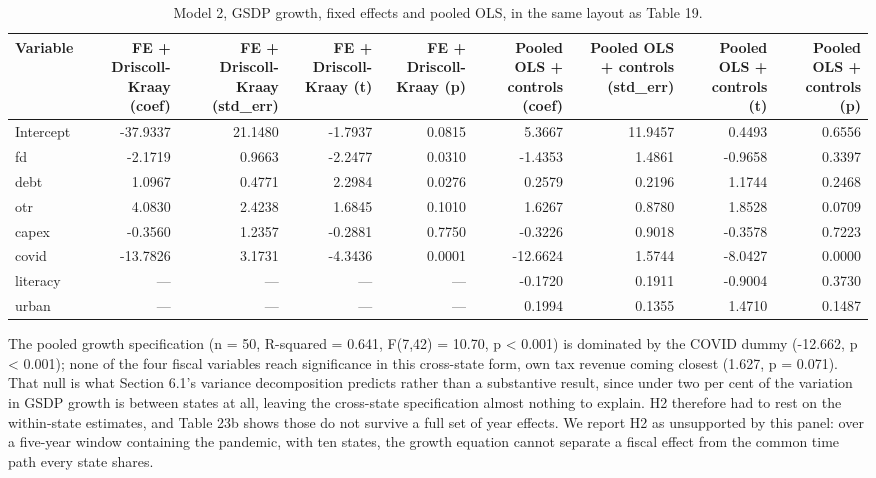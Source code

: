 \documentclass[12pt,a4paper]{article}
\begin{document}
\begin{table}[H]
\centering
\caption{Model 2, GSDP growth, fixed effects and pooled OLS, in the same layout as Table 19.}
\label{tab:20}
\footnotesize
\begin{adjustbox}{max width=\textwidth}
\begin{tabular}{@{}lrrrrrrrr@{}}
\toprule
Variable & FE + Driscoll-Kraay (coef) & FE + Driscoll-Kraay (std\_err) & FE + Driscoll-Kraay (t) & FE + Driscoll-Kraay (p) & Pooled OLS + controls (coef) & Pooled OLS + controls (std\_err) & Pooled OLS + controls (t) & Pooled OLS + controls (p) \\
\midrule
Intercept & -37.9337 & 21.1480 & -1.7937 & 0.0815 & 5.3667 & 11.9457 & 0.4493 & 0.6556 \\
fd & -2.1719 & 0.9663 & -2.2477 & 0.0310 & -1.4353 & 1.4861 & -0.9658 & 0.3397 \\
debt & 1.0967 & 0.4771 & 2.2984 & 0.0276 & 0.2579 & 0.2196 & 1.1744 & 0.2468 \\
otr & 4.0830 & 2.4238 & 1.6845 & 0.1010 & 1.6267 & 0.8780 & 1.8528 & 0.0709 \\
capex & -0.3560 & 1.2357 & -0.2881 & 0.7750 & -0.3226 & 0.9018 & -0.3578 & 0.7223 \\
covid & -13.7826 & 3.1731 & -4.3436 & 0.0001 & -12.6624 & 1.5744 & -8.0427 & 0.0000 \\
literacy & --- & --- & --- & --- & -0.1720 & 0.1911 & -0.9004 & 0.3730 \\
urban & --- & --- & --- & --- & 0.1994 & 0.1355 & 1.4710 & 0.1487 \\
\bottomrule
\end{tabular}
\end{adjustbox}
\end{table}

The pooled growth specification (n = 50, R-squared = 0.641, F(7,42) = 10.70, p < 0.001) is dominated by the COVID dummy (-12.662, p < 0.001); none of the four fiscal variables reach significance in this cross-state form, own tax revenue coming closest (1.627, p = 0.071). That null is what Section 6.1's variance decomposition predicts rather than a substantive result, since under two per cent of the variation in GSDP growth is between states at all, leaving the cross-state specification almost nothing to explain. H2 therefore had to rest on the within-state estimates, and Table 23b shows those do not survive a full set of year effects. We report H2 as unsupported by this panel: over a five-year window containing the pandemic, with ten states, the growth equation cannot separate a fiscal effect from the common time path every state shares.
\end{document}
